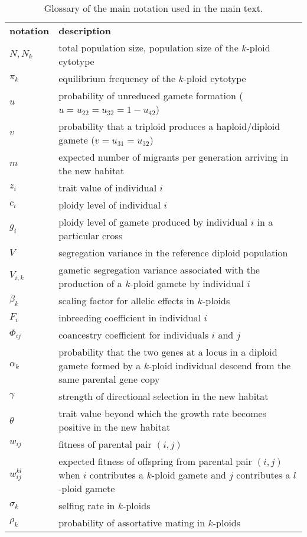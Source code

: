 \documentclass[11pt,a4paper]{article}
\begin{document}
\begin{table}[t]
\caption{Glossary of the main notation used in the main text.
} \label{tbl:glossary}
\centering
\small
\begin{tabularx}{\linewidth}{lX}
\cline{1-2}
\textbf{notation}   & \textbf{description}   \\ \cline{1-2}
$N, N_k$ & total population size, population size of the $k$-ploid cytotype \\
$\pi_k$ & equilibrium frequency of the $k$-ploid cytotype \\
$u$ & probability of unreduced gamete formation ($u=u_{22}=u_{32}=1-u_{42}$)\\
$v$ & probability that a triploid produces a haploid/diploid gamete
  ($v=u_{31}=u_{32}$)\\
$m$ & expected number of migrants per generation arriving in the new habitat \\
$z_i$ & trait value of individual $i$ \\
$c_i$ & ploidy level of individual $i$ \\
$g_i$ & ploidy level of gamete produced by individual $i$ in a particular cross\\
$V$ & segregation variance in the reference diploid population \\
$V_{i,k}$ & gametic segregation variance associated with the production of a
  $k$-ploid gamete by individual $i$ \\
$\beta_{k}$ & scaling factor for allelic effects in $k$-ploids \\
$F_i$ & inbreeding coefficient in individual $i$ \\
$\Phi_{ij}$ & coancestry coefficient for individuals $i$ and $j$ \\
$\alpha_k$ & probability that the two genes at a locus in a diploid gamete
  formed by a $k$-ploid individual descend from the same parental gene copy\\
$\gamma$ & strength of directional selection in the new habitat\\
$\theta$ & trait value beyond which the growth rate becomes positive in the new habitat \\
$w_{ij}$ & fitness of parental pair $(i,j)$ \\
$w_{ij}^{kl}$ & expected fitness of offspring from parental pair $(i,j)$ when
$i$ contributes a $k$-ploid gamete and $j$ contributes a $l$-ploid gamete \\
$\sigma_k$ & selfing rate in $k$-ploids \\
$\rho_k$ & probability of assortative mating in $k$-ploids \\
\cline{1-2}
\end{tabularx}%
\end{table}
\end{document}
